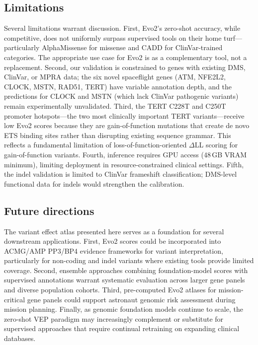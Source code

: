 \subsection*{Limitations}

Several limitations warrant discussion. First, Evo2's zero-shot accuracy, while
competitive, does not uniformly surpass supervised tools on their home turf---particularly
AlphaMissense for missense and CADD for ClinVar-trained categories. The appropriate
use case for Evo2 is as a complementary tool, not a replacement. Second, our
validation is constrained to genes with existing DMS, ClinVar, or MPRA data; the
six novel spaceflight genes (ATM, NFE2L2, CLOCK, MSTN, RAD51, TERT) have
variable annotation depth, and the predictions for CLOCK and MSTN (which lack
ClinVar pathogenic variants) remain experimentally unvalidated. Third, the TERT
C228T and C250T promoter hotspots---the two most clinically important TERT
variants---receive low Evo2 scores because they are gain-of-function mutations
that create de novo ETS binding sites rather than disrupting existing sequence
grammar. This reflects a fundamental limitation of loss-of-function-oriented
$\Delta$LL scoring for gain-of-function variants. Fourth, inference requires
GPU access (48\,GB VRAM minimum), limiting deployment in resource-constrained
clinical settings. Fifth, the indel validation is limited to ClinVar frameshift
classification; DMS-level functional data for indels would strengthen the
calibration.

\subsection*{Future directions}

The variant effect atlas presented here serves as a foundation for several
downstream applications. First, Evo2 scores could be incorporated into
ACMG/AMP PP3/BP4 evidence frameworks for variant interpretation, particularly
for non-coding and indel variants where existing tools provide limited coverage.
Second, ensemble approaches combining foundation-model scores with supervised
annotations warrant systematic evaluation across larger gene panels and diverse
population cohorts. Third, pre-computed Evo2 atlases for mission-critical gene
panels could support astronaut genomic risk assessment during mission planning.
Finally, as genomic foundation models continue to scale, the zero-shot VEP
paradigm may increasingly complement or substitute for supervised approaches
that require continual retraining on expanding clinical databases.
